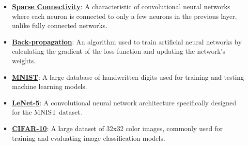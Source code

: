 \documentclass{article}%
\begin{document}
\begin{itemize}[leftmargin=*]
\item \href{https://purdue.brightspace.com/d2l/common/assets/pdfjs-d2l-dist/1.0.14-legacy/web/viewer.html?file=\%2Fcontent\%2Fenforced\%2F1095467-wl.202510.CS.24300.001\%2F09L1-cnn.pdf\%3Fou\%3D1095467\&lang=en-us\&container=d2l-fileviewer-rendered-pdf\&fullscreen=d2l-fileviewer-rendered-pdf-dialog\&height=667#page=10}{\textbf{Sparse Connectivity}}: A characteristic of convolutional neural networks where each neuron is connected to only a few neurons in the previous layer, unlike fully connected networks.%
\item \href{https://purdue.brightspace.com/d2l/common/assets/pdfjs-d2l-dist/1.0.14-legacy/web/viewer.html?file=\%2Fcontent\%2Fenforced\%2F1095467-wl.202510.CS.24300.001\%2F09L1-cnn.pdf\%3Fou\%3D1095467\&lang=en-us\&container=d2l-fileviewer-rendered-pdf\&fullscreen=d2l-fileviewer-rendered-pdf-dialog\&height=667#page=16}{\textbf{Back{-}propagation}}: An algorithm used to train artificial neural networks by calculating the gradient of the loss function and updating the network's weights.%
\item \href{https://purdue.brightspace.com/d2l/common/assets/pdfjs-d2l-dist/1.0.14-legacy/web/viewer.html?file=\%2Fcontent\%2Fenforced\%2F1095467-wl.202510.CS.24300.001\%2F09L1-cnn.pdf\%3Fou\%3D1095467\&lang=en-us\&container=d2l-fileviewer-rendered-pdf\&fullscreen=d2l-fileviewer-rendered-pdf-dialog\&height=667#page=21}{\textbf{MNIST}}: A large database of handwritten digits used for training and testing machine learning models.%
\item \href{https://purdue.brightspace.com/d2l/common/assets/pdfjs-d2l-dist/1.0.14-legacy/web/viewer.html?file=\%2Fcontent\%2Fenforced\%2F1095467-wl.202510.CS.24300.001\%2F09L1-cnn.pdf\%3Fou\%3D1095467\&lang=en-us\&container=d2l-fileviewer-rendered-pdf\&fullscreen=d2l-fileviewer-rendered-pdf-dialog\&height=667#page=22}{\textbf{LeNet{-}5}}: A convolutional neural network architecture specifically designed for the MNIST dataset.%
\item \href{https://purdue.brightspace.com/d2l/common/assets/pdfjs-d2l-dist/1.0.14-legacy/web/viewer.html?file=\%2Fcontent\%2Fenforced\%2F1095467-wl.202510.CS.24300.001\%2F09L1-cnn.pdf\%3Fou\%3D1095467\&lang=en-us\&container=d2l-fileviewer-rendered-pdf\&fullscreen=d2l-fileviewer-rendered-pdf-dialog\&height=667#page=23}{\textbf{CIFAR{-}10}}: A large dataset of 32x32 color images, commonly used for training and evaluating image classification models.%
\end{itemize}%
\end{document}
